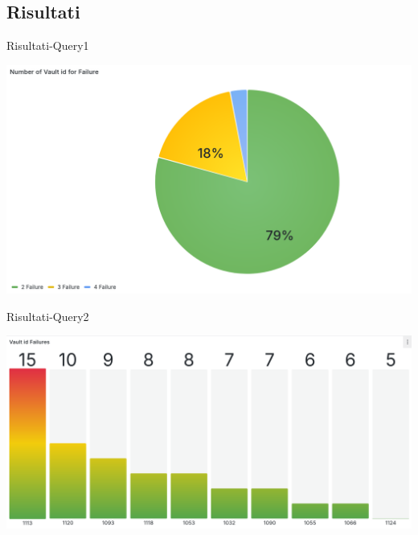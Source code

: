 \documentclass[13pt,aspectratio=169,t,xcolor=table]{beamer}
\begin{document}
\subsection{Risultati}
\begin{frame}{Risultati-Query1}
    \begin{minipage}{0.9\textwidth}
        \begin{adjustbox}{margin=1cm 0cm 1.5cm 0cm, center}
            \includegraphics[width=1\textwidth]{res/query1_panel1.png}
        \end{adjustbox}
    \end{minipage}
\end{frame}

\begin{frame}{Risultati-Query2}
    \begin{minipage}{0.9\textwidth}
        \begin{adjustbox}{margin=1cm 0cm 1.5cm 0cm, center}
            \includegraphics[width=1\textwidth]{res/query2_panel1.png}
        \end{adjustbox}
    \end{minipage}
\end{frame}
\end{document}
